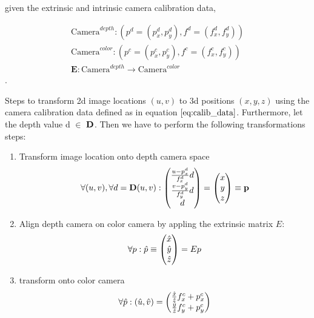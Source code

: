 given the extrinsic and intrinsic camera calibration data,

\begin{equation}
\begin{aligned}
	\text{Camera}^{depth} : \left( p^d = (p_x^d, p_y^d), f^d = (f_x^d, f_y^d)\right) \\
	\text{Camera}^{color} : \left( p^c = (p_x^c, p_y^c), f^c = (f_x^c, f_y^c)\right) \\
	\textbf{E} : \text{Camera}^{depth} \rightarrow \text{Camera}^{color}
\end{aligned}
\label{eq:calib_data}
\end{equation}.

Steps to transform 2d image locations $\left( u, v \right)$ to 3d positions $\left( x, y, z \right)$ using the camera calibration data defined as in equation $\ref{eq:calib_data}$. Furthermore, let the depth value d $\in$ $\bf{D}$. Then we have to perform the following transformations steps:

\begin{enumerate}
\item Transform image location onto depth camera space
\begin{equation}
	\forall (u, v), \forall d = \textbf{D}(u,v): \colvec[\frac{u - p_x^d}{f_x^d} d]{\frac{v - p_y^d}{f_y^d} d}{d} = \colvec[x]{y}{z} \equiv \bf{p}
\end{equation}
\item Align depth camera on color camera by appling the extrinsic matrix $E$:
\begin{equation}
	\forall p: \hat{p} \equiv \colvec[\hat{x}]{\hat{y}}{\hat{z}} =  E p
\end{equation}
\item transform onto color camera
\begin{equation}
	\forall \hat{p} : \left( \hat{u}, \hat{v}\right) = \colvec{\frac{\hat{x}}{\hat{z}} f_x^c + p_x^c}{\frac{\hat{y}}{\hat{z}} f_y^c + p_y^c}
\end{equation}
\end{enumerate}



